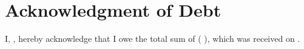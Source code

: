 
\section{Acknowledgment of Debt}
\label{sec:acknowledgement}

I, \BorrowerName{}, hereby acknowledge that I owe \LenderName{} the total sum of \LendedAmountNumber{} \LendedAmountCurrencySymbol{} (\LendedAmountWord{} \LendedAmountCurrencyWord{}), which was received on \LendedAmountDate{}.

